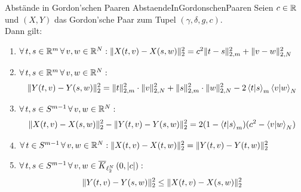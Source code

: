 \begin{lemma}{Abstände in Gordon'schen Paaren}
             {AbstaendeInGordonschenPaaren}
Seien $c \in \mathbb{R}$ und $(X, Y)$ das Gordon'sche Paar zum Tupel 
$(\gamma, \delta, g, c)$.\\
Dann gilt:
\begin{enumerate}[(1)]
	\item \label{AbstaendeInGordonschenPaaren1}
	$\forall\, t, s \in \mathbb{R}^m\, \forall\, v, w \in \mathbb{R}^N: 
	\lVert X(t, v) - X(s, w)\rVert_2^2 = c^2\lVert t-s\rVert_{2,m}^2 + \lVert v-w\rVert_{2,N}^2$
	\item \label{AbstaendeInGordonschenPaaren2}
	$\forall\, t, s \in \mathbb{R}^m\, \forall\, v, w \in \mathbb{R}^N:$
	\[\lVert Y(t, v) - Y(s, w)\rVert_2^2 
	= \lVert t\rVert _{2,m}^2\cdot\lVert v\rVert_{2,N}^2 + \lVert s\rVert_{2,m}^2\cdot\lVert w\rVert_{2,N}^2
	  - 2\left\langle t |s\right\rangle _m\left\langle v |w\right\rangle_N\]
	\item \label{AbstaendeInGordonschenPaaren3}
	$\forall\, t, s \in S^{m-1}\, \forall\, v, w \in \mathbb{R}^N:$
	\[\lVert X(t, v) - X(s, w)\rVert_2^2 - \lVert Y(t, v) - Y(s, w)\rVert_2^2
	= 2(1-\left\langle t |s\right\rangle _m)(c^2-\left\langle v |w\right\rangle_N)\]
	\item \label{AbstaendeInGordonschenPaaren4}
	$\forall\, t \in S^{m-1}\, \forall\, v, w \in \mathbb{R}^N: 
	\lVert X(t, v) - X(t, w)\rVert_2^2 = \lVert Y(t, v) - Y(t, w)\rVert_2^2$
	\item \label{AbstaendeInGordonschenPaaren5}
	$\forall\, t, s \in S^{m-1}\, \forall\, v, w \in \overline K_{\ell_2^N}\left(0, \left|c\right|\right):$
	\[\lVert Y(t, v) - Y(s, w)\rVert_2^2 \le \lVert X(t, v) - X(s, w)\rVert_2^2\]
\end{enumerate}
\end{lemma}
